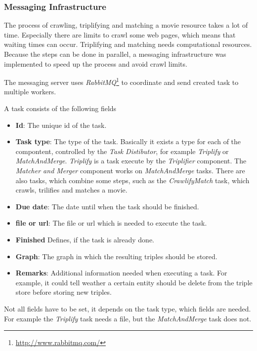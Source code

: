 \subsubsection{Messaging Infrastructure}
\label{subsubsec_messaging_infrastructure}


The process of crawling, triplifying and matching a movie resource takes a lot of time.
Especially there are limits to crawl some web pages, which means that waiting times can occur. Triplifying and matching needs computational resources.
Because the steps can be done in parallel, a messaging infrastructure was implemented to speed up the process and avoid crawl limits.

The messaging server uses \emph{RabbitMQ}\footnote{\url{http://www.rabbitmq.com/}} to coordinate and send created task to multiple workers.

A task consists of the following fields
\begin{itemize}
  \item \textbf{Id}: 
  The unique id of the task.
  \item \textbf{Task type}:
   The type of the task.
  Basically it exists a type for each of the compontent, controlled by the \textit{Task Distibutor}, for example \textit{Triplify} or \textit{MatchAndMerge}.
  \textit{Triplify} is a task execute by the \textit{Triplifier} component.
  The \textit{Matcher and Merger} component works on \textit{MatchAndMerge} tasks.
  There are also tasks, which combine some steps, such as the \textit{CrawlifyMatch} task, which crawls, trilifies and matches a movie.
  \item \textbf{Due date}: 
  The date until when the task should be finished.
  \item \textbf{file or url}: 
  The file or url which is needed to execute the task.
  \item \textbf{Finished}
  Defines, if the task is already done.
  \item \textbf{Graph}: 
  The graph in which the resulting triples should be stored.
  \item \textbf{Remarks}: 
  Additional information needed when executing a task.
  For example, it could tell weather a certain entity should be delete from the triple store before storing new triples.
\end{itemize}
Not all fields have to be set, it depends on the task type, which fields are needed.
For example the \textit{Triplify} task needs a file, but the \textit{MatchAndMerge} task does not.

